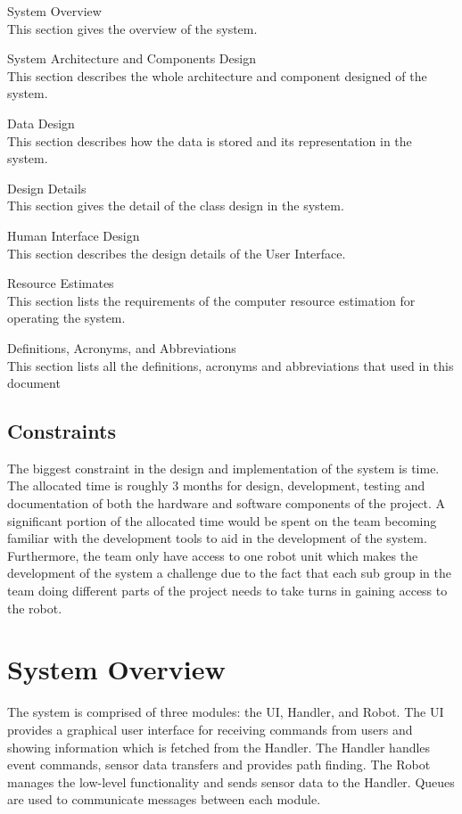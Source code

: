 \documentclass[12pt,a4paper]{article}
\renewenvironment{enumerate}[1]{\begin{compactenum}#1}{\end{compactenum}}
\begin{document}
\begin{enumerate}
  \item System Overview \\
  This section gives the overview of the system.
  \item System Architecture and Components Design \\
  This section describes the whole architecture and component designed of the system.
  \item Data Design \\
  This section describes how the data is stored and its representation in the system.
  \item Design Details \\
  This section gives the detail of the class design in the system.
  \item Human Interface Design \\
  This section describes the design details of the User Interface.
  \item Resource Estimates \\
  This section lists the requirements of the computer resource estimation for operating the system.
  \item Definitions, Acronyms, and Abbreviations \\
  This section lists all the definitions, acronyms and abbreviations that used in this document
  
  
\end{enumerate}

\subsection{Constraints}
The biggest constraint in the design and implementation of the system is time. The allocated time is roughly 3 months for design, development, testing and documentation of both the hardware and software components of the project. A significant portion of the allocated time would be spent on  the team becoming familiar with the development tools to aid in the development of the system. Furthermore, the team only have access to one robot unit which makes the development of the system a challenge due to the fact that each sub group in the team doing different parts of the project needs to take turns in gaining access to the robot.

\section{System Overview}
The system is comprised of three modules: the UI, Handler, and Robot. The UI provides a graphical user interface for receiving commands from users and showing information which is fetched from the Handler. The Handler handles event commands, sensor data transfers and provides path finding. The Robot manages the low-level functionality and sends sensor data to the Handler. Queues are used to communicate messages between each module.
\end{document}
